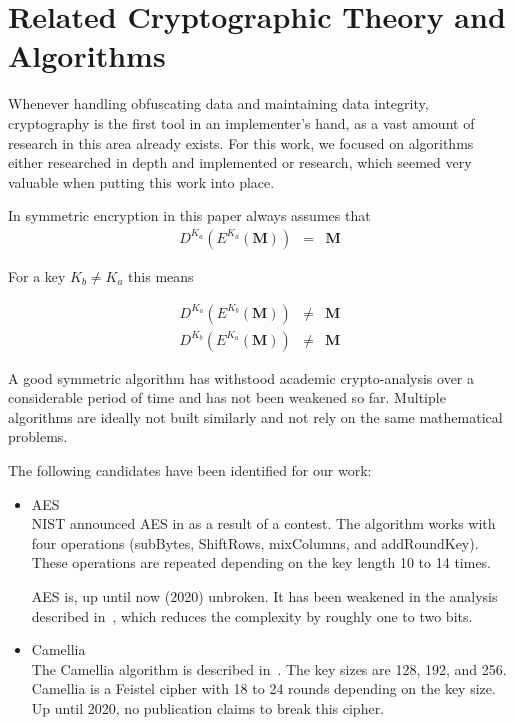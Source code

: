 \chapter{Related Cryptographic Theory and Algorithms}\label{sec:cryptoResearch}

Whenever handling obfuscating data and maintaining data integrity, cryptography is the first tool in an implementer's hand, as a vast amount of research in this area already exists. For this work, we focused on algorithms either researched in depth and implemented or research, which seemed very valuable when putting this work into place. 

In symmetric encryption in this paper always assumes that
\begin{eqnarray}
	D^{K_a}\left(E^{K_a}\left(\mathbf{M}\right)\right) & = & \mathbf{M}
\end{eqnarray} 

For a key $K_b\neq K_a$ this means

\begin{eqnarray}
	D^{K_a}\left(E^{K_b}\left(\mathbf{M}\right)\right) & \neq & \mathbf{M}\\
	D^{K_b}\left(E^{K_a}\left(\mathbf{M}\right)\right) & \neq & \mathbf{M}
\end{eqnarray} 

A good symmetric algorithm has withstood academic crypto-analysis over a considerable period of time and has not been weakened so far. Multiple algorithms are ideally not built similarly and  not rely on the same mathematical problems.

The following candidates have been identified for our work:
\begin{itemize}
	\item AES\\
	NIST announced AES in \citeyear{standard2001announcing} as a result of a contest. The algorithm works with four operations (subBytes, ShiftRows, mixColumns, and addRoundKey). These operations are repeated depending on the key length 10 to 14 times. 
	
	AES is, up until now (2020) unbroken. It has been weakened in the analysis described in~\cite{tao2015improving}, which reduces the complexity by roughly one to two bits. 
	
	\item Camellia\\
	The Camellia algorithm is described in~\cite{rfc3713}. The key sizes are 128, 192, and 256. Camellia is a Feistel cipher with 18 to 24 rounds depending on the key size. Up until 2020, no publication claims to break this cipher. 
\end{itemize}

